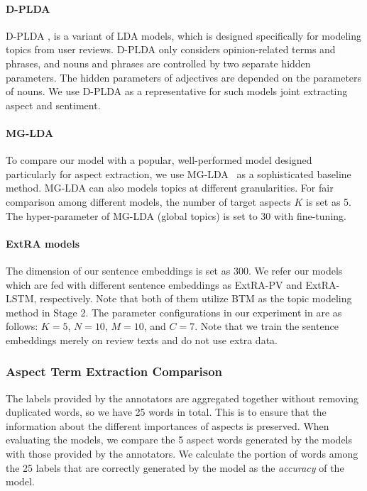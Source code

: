 \paragraph{D-PLDA}
D-PLDA \cite{moghaddam2012design}, 
is a variant of LDA models, which is designed specifically for modeling topics from user reviews.  
D-PLDA only considers opinion-related terms and phrases, 
and nouns and phrases are controlled by two separate hidden parameters. 
The hidden parameters of adjectives are depended on the parameters of nouns.
We use D-PLDA as a representative for such models joint extracting aspect and sentiment.

\paragraph{MG-LDA}
To compare our model with a popular, well-performed model designed particularly for aspect extraction, 
we use MG-LDA~\cite{titov2008modeling} as a sophisticated baseline method. 
MG-LDA can also models topics at different granularities. 
For fair comparison among different models, the number of target aspects $K$ is set as 5.
The hyper-parameter of MG-LDA (global topics) is set to 30 with fine-tuning.

\paragraph{ExtRA models}
\label{ourmodels}
The dimension of our sentence embeddings is set as 300.
We refer our models which are fed with different sentence embeddings as ExtRA-PV and ExtRA-LSTM, respectively.
Note that both of them utilize BTM as the topic modeling method in Stage 2.
The parameter configurations in our experiment in  are as follows:
 $K=5$, $N=10$, $M=10$, and $C=7$.
Note that we train the sentence embeddings merely on review texts and do not use extra data. 

\subsubsection{Aspect Term Extraction Comparison}
The labels provided by the annotators are aggregated together without removing duplicated words, so we have 25 words in total.
This is to ensure that the information about the different importances of aspects is preserved.
When evaluating the models, 
we compare the 5 aspect words generated by the models with those provided 
by the annotators. 
We calculate the portion of words among the 25 labels that 
are correctly generated by the model as the \textit{accuracy} of the model.

